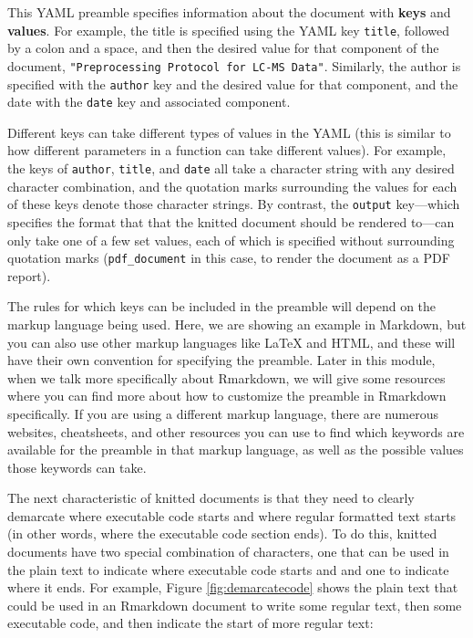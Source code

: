 \documentclass[]{tufte-book}
\begin{document}
This YAML preamble specifies information about the document with \textbf{keys} and
\textbf{values}. For example, the title is specified using the YAML key \texttt{title},
followed by a colon and a space, and then the desired value for that
component of the document, \texttt{"Preprocessing\ Protocol\ for\ LC-MS\ Data"}.
Similarly, the author is specified with the \texttt{author} key and the desired
value for that component, and the date with the \texttt{date} key and associated
component.

Different keys can take different types of values in the YAML
(this is similar to how different parameters in a function can take different values). For example, the keys of \texttt{author}, \texttt{title}, and \texttt{date} all take
a character string with any desired character combination, and the quotation
marks surrounding the values for each of these keys denote those character strings. By contrast, the \texttt{output} key---which specifies the format that
that the knitted document should be rendered to---can only take one of a
few set values, each of which is specified without surrounding
quotation marks (\texttt{pdf\_document} in this case, to render the document
as a PDF report).

The rules for which keys can be included in the preamble will depend on the
markup language being used. Here, we are showing an example in Markdown, but you
can also use other markup languages like LaTeX and HTML, and these will have
their own convention for specifying the preamble. Later in this module, when we
talk more specifically about Rmarkdown, we will give some resources where you
can find more about how to customize the preamble in Rmarkdown specifically. If
you are using a different markup language, there are numerous websites,
cheatsheets, and other resources you can use to find which keywords are
available for the preamble in that markup language, as well as the possible
values those keywords can take.

The next characteristic of knitted documents is that they need to clearly
demarcate where executable code starts and where regular formatted text starts
(in other words, where the executable code section ends). To do this, knitted
documents have two special combination of characters, one that can be used in
the plain text to indicate where executable code starts and and one to indicate
where it ends. For example, Figure \ref{fig:demarcatecode} shows the plain text
that could be used in an Rmarkdown document to write some regular text, then
some executable code, and then indicate the start of more regular text:
\end{document}
